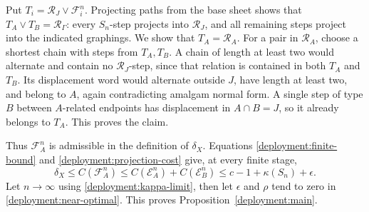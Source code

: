 Put \(T_i=\mathcal R_J\vee\mathcal F_i^n\).  Projecting paths from
the base sheet shows that
\(T_A\vee T_B=\mathcal R_\Gamma\): every \(S_n\)-step projects into
\(\mathcal R_J\), and all remaining steps project into the indicated
graphings.  We show that \(T_A=\mathcal R_A\).
For a pair in \(\mathcal R_A\), choose a shortest chain with steps
from \(T_A,T_B\).  A chain of length at least two would alternate and
contain no \(\mathcal R_J\)-step, since that relation is contained in
both \(T_A\) and \(T_B\).  Its displacement word would alternate
outside \(J\), have length at least two, and belong to \(A\), again
contradicting amalgam normal form.  A single step of type \(B\)
between \(A\)-related endpoints has displacement in
\(A\cap B=J\), so it already belongs to \(T_A\).  This proves the
claim.

Thus \(\mathcal F_A^n\) is admissible in the definition of
\(\delta_X\).  Equations \eqref{deployment:finite-bound} and
\eqref{deployment:projection-cost} give, at every finite stage,
\[
 \delta_X\leq C(\mathcal F_A^n)
 \leq C(\mathcal E_A^n)+C(\mathcal E_B^n)
 \leq c-1+\kappa(S_n)+\epsilon.
\]
Let \(n\to\infty\) using \eqref{deployment:kappa-limit}, then let
\(\epsilon\) and \(\rho\) tend to zero in
\eqref{deployment:near-optimal}.  This proves
Proposition~\ref{deployment:main}.
